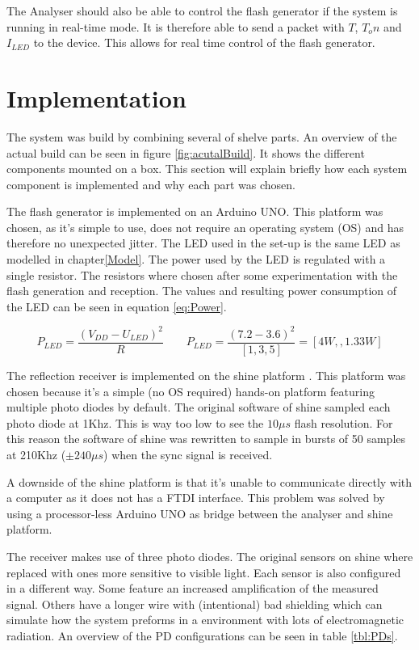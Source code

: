 The Analyser should also be able to control the flash generator if the system is running in real-time mode. It is therefore able to send a packet with $T$, ${T_on}$ and $I_{LED}$ to the device. This allows for real time control of the flash generator.

\section{Implementation}
The system was build by combining several of shelve parts. An overview of the actual build can be seen in figure \ref{fig:acutalBuild}. It shows the different components mounted on a box. This section will explain briefly how each system component is implemented and why each part was chosen.

The flash generator is implemented on an Arduino UNO\cite{ArduinoUno}. This platform was chosen, as it's simple to use, does not require an operating system (OS) and has therefore no unexpected jitter. The LED used in the set-up is the same LED as modelled in chapter\ref{Model}\cite{lamptest}. The power used by the LED is regulated with a single resistor. The resistors where chosen after some experimentation with the flash generation and reception. The values and resulting power consumption of the LED can be seen in equation \ref{eq:Power}.

\begin{equation}
\label{eq:Power}
P_{LED}=\frac{(V_{DD} - U_{LED})^2}{R}
\qquad
P_{LED} = \frac{(7.2 - 3.6)^2}{[1, 3, 5]} = [4W, ,1.33W]
\end{equation}

The reflection receiver is implemented on the shine platform \cite{Shine}. This platform was chosen because it's a simple (no OS required) hands-on platform featuring multiple photo diodes by default. The original software of shine sampled each photo diode at 1Khz. This is way too low to see the $10\mu s$ flash resolution. For this reason the software of shine was rewritten to sample in bursts of 50 samples at 210Khz ($\pm 240\mu s$) when the sync signal is received.

A downside of the shine platform is that it's unable to communicate directly with a computer as it does not has a FTDI interface. This problem was solved by using a processor-less Arduino UNO as bridge between the analyser and shine platform.

The receiver makes use of three photo diodes. The original sensors on shine where replaced with ones more sensitive to visible light. Each sensor is also configured in a different way. Some feature an increased amplification of the measured signal. Others have a longer wire with (intentional) bad shielding which can simulate how the system preforms in a environment with lots of electromagnetic radiation. An overview of the PD configurations can be seen in table \ref{tbl:PDs}.

